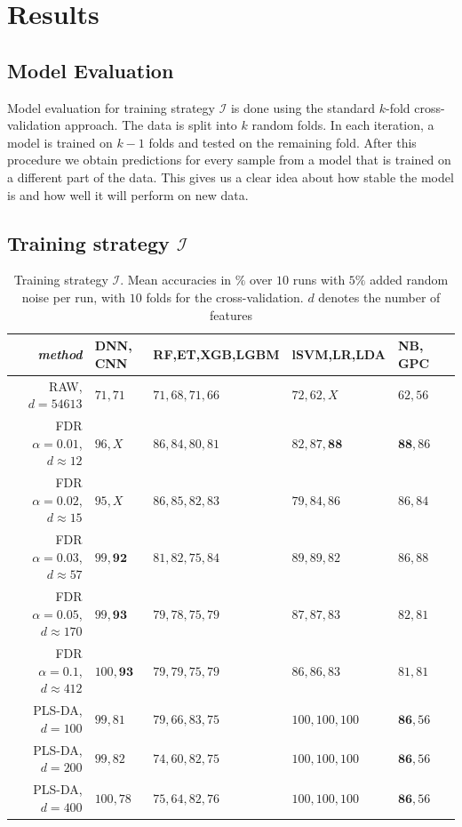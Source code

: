 \documentclass[a4paper,10pt]{article}
\begin{document}
\section{Results}
% 
\subsection{Model Evaluation}
%
Model evaluation for training strategy $\mathcal{I}$ is done using the standard $k$-fold cross-validation approach. The data is split into $k$ random folds. In each iteration, a model is trained on $k-1$ folds and tested on the remaining fold. After this procedure we obtain predictions for every sample from a model that is trained on a different part of the data. This gives us a clear idea about how stable the model is and how well it will perform on new data.
%
\subsection{Training strategy $\mathcal{I}$}
%
\begin{table}[htp]
\centering
\begin{tabular}{rlllll}

\textit{method}						& DNN, CNN 		& RF,ET,XGB,LGBM	&  lSVM,LR,LDA		& NB, GPC  			\\
							\hline
RAW, $d=54613$ 						& $71, 71$	 	&  $71, 68, 71, 66$	&  $72, 62, X$		&  $62, 56$  			\\
FDR $\alpha=0.01$, $d\approx 12$ 			& $96, X$  		&  $86, 84, 80, 81$	&  $82, 87, \mathbf{88}$&  $\mathbf{88}, 86$  		\\
FDR $\alpha=0.02$, $d\approx 15$ 			& $95, X$	  	&  $86, 85, 82, 83$	&  $79, 84, 86$		&  $86, 84$			\\
FDR $\alpha=0.03$, $d\approx 57$ 			& $99, \mathbf{92}$  	&  $81, 82, 75, 84$	&  $89, 89, 82$		&  $86, 88$			\\
FDR $\alpha=0.05$, $d\approx 170$ 			& $99, \mathbf{93}$  	&  $79, 78, 75, 79$	&  $87, 87, 83$		&  $82, 81$			\\
FDR $\alpha=0.1$,  $d\approx 412$ 			& $100,\mathbf{93}$	&  $79, 79, 75, 79$	&  $86, 86, 83$		&  $81, 81$			\\
PLS-DA, $d=100$ 					& $99, 81$		&  $79, 66, 83, 75$	&  $100, 100, 100$	&  $\mathbf{86}, 56$		\\
PLS-DA, $d=200$ 					& $99, 82$		&  $74, 60, 82, 75$	&  $100, 100, 100$  	&  $\mathbf{86}, 56$		\\
PLS-DA, $d=400$ 					& $100, 78$		&  $75, 64, 82, 76$	&  $100, 100, 100$  	&  $\mathbf{86}, 56$		
\end{tabular}
\caption{Training strategy $\mathcal{I}$. Mean accuracies in $\%$ over $10$ runs with $5\%$ added random noise per run, with $10$ folds for the cross-validation. $d$ denotes the number of features}
\label{tab:diversitymetrics}
\end{table}
\end{document}

